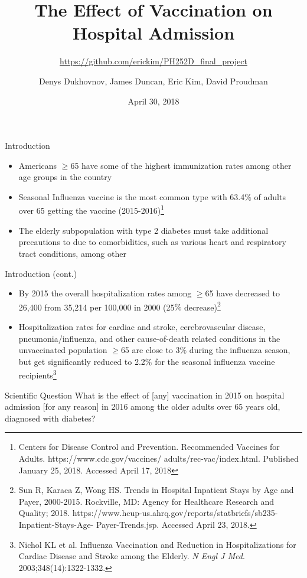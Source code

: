 \documentclass[english]{beamer}
\title[]{The Effect of Vaccination on Hospital Admission}
\subtitle{\small \url{https://github.com/erickim/PH252D\_final\_project}}
\author[Dukhovnov, Duncan, Kim, Proudman]{Denys Dukhovnov, James Duncan, Eric Kim, David Proudman}
\date{April 30, 2018}
\begin{document}
\begin{frame}
\titlepage
\end{frame}

\begin{frame}{Introduction}
\begin{itemize}
\item Americans $\geq$65 have some of the highest immunization rates among other age groups in the country
\item Seasonal Influenza vaccine is the most common type with 63.4$\%$ of adults over 65 getting the vaccine (2015-2016)\footnote{\tiny{Centers for Disease Control and Prevention. Recommended Vaccines for Adults. https://www.cdc.gov/vaccines/ adults/rec-vac/index.html. Published January 25, 2018. Accessed April 17, 2018}} 
\item The elderly subpopulation with type 2 diabetes must take additional precautions to due to comorbidities, such as various heart and respiratory tract conditions, among other
\end{itemize}
\end{frame}

\begin{frame}{Introduction (cont.)}
\begin{itemize}
\item By 2015 the overall hospitalization rates among $\geq$65 have decreased to 26,400 from 35,214 per 100,000 in 2000 (25$\%$ decrease)\footnote{\tiny{Sun R, Karaca Z, Wong HS. Trends in Hospital Inpatient Stays by Age and Payer, 2000-2015. Rockville, MD: Agency for Healthcare Research and Quality; 2018. https://www.hcup-us.ahrq.gov/reports/statbriefs/sb235-Inpatient-Stays-Age- Payer-Trends.jsp. Accessed April 23, 2018.}}
\item Hospitalization rates for cardiac and stroke, cerebrovascular disease, pneumonia/influenza, and other cause-of-death related conditions in the unvaccinated population $\geq$65 are close to 3$\%$ during the influenza season, but get significantly reduced to 2.2$\%$ for the seasonal influenza vaccine recipients\footnote{\tiny{Nichol KL et al. Influenza Vaccination and Reduction in Hospitalizations for Cardiac Disease and Stroke among the Elderly. \textit{N Engl J Med}. 2003;348(14):1322-1332.}}
\end{itemize}
\end{frame}

\begin{frame}{Scientific Question}
What is the effect of [any] vaccination in 2015 on hospital admission [for any reason] in 2016 among the older adults over 65 years old, diagnosed with diabetes?
\end{frame}
\end{document}

